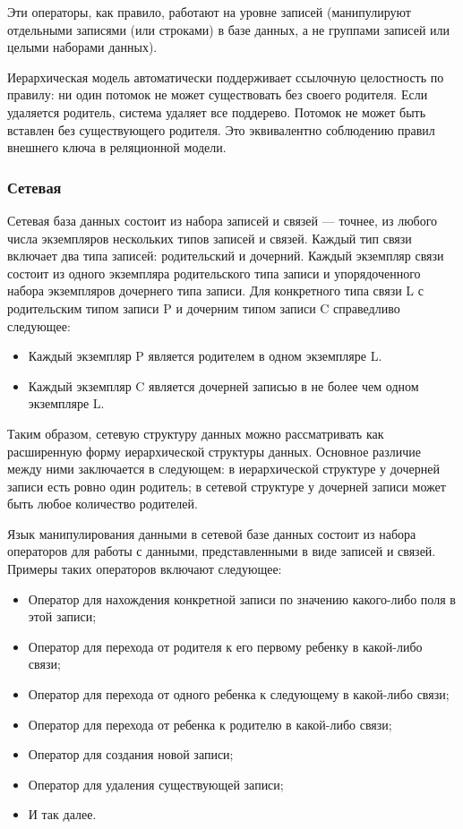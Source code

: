 Эти операторы, как правило, работают на уровне записей (манипулируют отдельными записями (или строками) в базе данных, а не группами записей или целыми наборами данных).~\cite[с. 410]{date-wr}

Иерархическая модель автоматически поддерживает ссылочную целостность по правилу: ни один потомок не может существовать без своего родителя.
Если удаляется родитель, система удаляет все поддерево.
Потомок не может быть вставлен без существующего родителя.
Это эквивалентно соблюдению правил внешнего ключа в реляционной модели.~\cite[с. 411]{date-wr}

\subsubsection{Сетевая}

Сетевая база данных состоит из набора записей и связей --- точнее, из любого числа экземпляров нескольких типов записей и связей.
Каждый тип связи включает два типа записей: родительский и дочерний.
Каждый экземпляр связи состоит из одного экземпляра родительского типа записи и упорядоченного набора экземпляров дочернего типа записи.
Для конкретного типа связи L с родительским типом записи P и дочерним типом записи C справедливо следующее:
\begin{itemize}
    \item Каждый экземпляр P является родителем в одном экземпляре L.
    \item Каждый экземпляр C является дочерней записью в не более чем одном экземпляре L.
\end{itemize}

Таким образом, сетевую структуру данных можно рассматривать как расширенную форму иерархической структуры данных.
Основное различие между ними заключается в следующем: в иерархической структуре у дочерней записи есть ровно один родитель; в сетевой структуре у дочерней записи может быть любое количество родителей.~\cite[с. 447]{date-wr}

Язык манипулирования данными в сетевой базе данных состоит из набора операторов для работы с данными, представленными в виде записей и связей.
Примеры таких операторов включают следующее:
\begin{itemize}
    \item Оператор для нахождения конкретной записи по значению какого-либо поля в этой записи;
    \item Оператор для перехода от родителя к его первому ребенку в какой-либо связи;
    \item Оператор для перехода от одного ребенка к следующему в какой-либо связи;
    \item Оператор для перехода от ребенка к родителю в какой-либо связи;
    \item Оператор для создания новой записи;
    \item Оператор для удаления существующей записи;
    \item И так далее.
\end{itemize}

